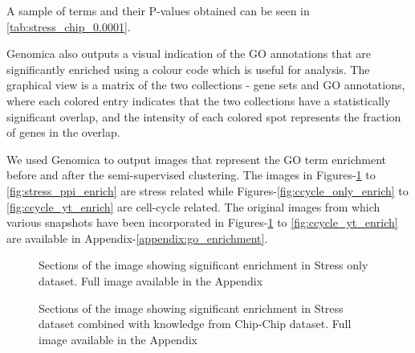 
A sample of terms and their P-values obtained can be seen in \ref{tab:stress_chip_0.0001}. 

Genomica also outputs a visual indication of the GO annotations that are significantly enriched using a colour code which is useful for analysis. The graphical view is a 
matrix of the two collections - gene sets and GO annotations, where each colored entry indicates that the two collections have a statistically significant 
overlap, and the intensity of each colored spot represents the fraction of genes in the overlap. 

We used Genomica to output images that represent the GO term enrichment before and after the semi-supervised clustering. 
The images in Figures-\ref{fig:stress_only_enrich} to \ref{fig:stress_ppi_enrich} are stress related while Figures-\ref{fig:ccycle_only_enrich} to \ref{fig:ccycle_yt_enrich} are cell-cycle
 related. The original images from which various snapshots have been incorporated in Figures-\ref{fig:stress_only_enrich} to \ref{fig:ccycle_yt_enrich} are available in 
Appendix-\ref{appendix:go_enrichment}. 

\begin{figure}[ph]
\centering
{}
\label{fig:stress_only_enrich}
\caption[]{Sections of the image showing significant enrichment in Stress only dataset. Full image available in the Appendix}
\end{figure}

\begin{figure}[p]
\centering
{}
\label{fig:stress_chip_enrich}
\caption[]{Sections of the image showing significant enrichment in Stress dataset combined with knowledge from Chip-Chip dataset. Full image available in the Appendix}
\end{figure}

